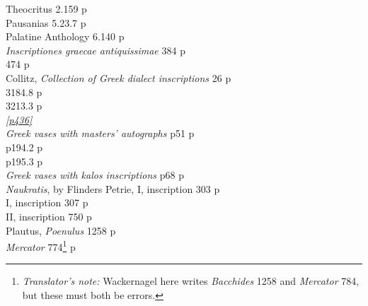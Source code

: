 Theocritus 2.159 \dotfill p\pageref{tiska22}\\
Pausanias 5.23.7 \dotfill p\pageref{paus4}\\
Palatine Anthology 6.140 \dotfill p\pageref{epi12}\\
\textit{Inscriptiones graecae antiquissimae} \citep{Roehl1882} 384 \dotfill p\pageref{IGA384}\\
 474 \dotfill p\pageref{IGA474}\\
Collitz, \textit{Collection of Greek dialect inscriptions} 26 \dotfill p\pageref{artprep2}\\
 3184.8 \dotfill p\pageref{dodonian3}\\
 3213.3 \dotfill p\pageref{tiska25}\\
\hyperlink{p436}{\emph{[p436]}}\\
\textit{Greek vases with masters' autographs} \citep{Klein1887} p51 \dotfill p\pageref{rulebreaker}\\
 p194.2 \dotfill p\pageref{kleinx2}\\
 p195.3 \dotfill p\pageref{kleinx2}\\
\textit{Greek vases with kalos inscriptions} \citep{Klein1890} p68 \dotfill p\pageref{Klein68}\\
\textit{Naukratis}, by Flinders Petrie, I, inscription 303 \dotfill p\pageref{naukratisx2}\\
 I, inscription 307 \dotfill p\pageref{naukratisx2}\\
 II, inscription 750 \dotfill p\pageref{Naukratis2750}\\
Plautus, \textit{Poenulus} 1258 \dotfill p\pageref{formulaeWithDi13}\\
\phantom{Plautus,} \textit{Mercator} 774\footnote{\textit{Translator's note:} Wackernagel here writes \textit{Bacchides} 1258 and \textit{Mercator} 784, but these must both be errors.} \dotfill p\pageref{mercator}
